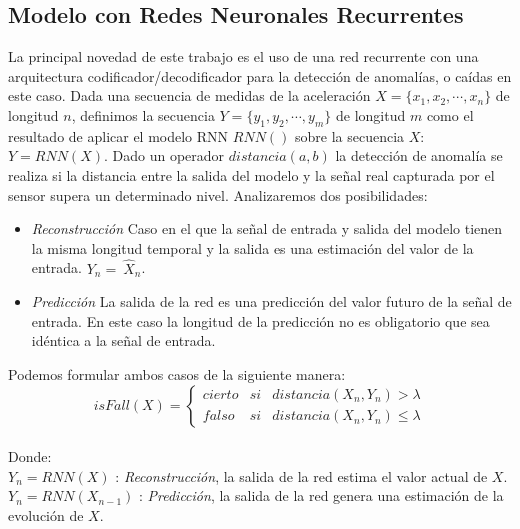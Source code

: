 \subsection{Modelo con Redes Neuronales Recurrentes}\label{sub:imp:model:rnn}

La principal novedad de este trabajo es el uso de una red recurrente con una arquitectura codificador/decodificador para la detección de anomalías, o caídas en este caso. Dada una secuencia de medidas de la aceleración $X=\{x_1,x_2,\cdots,x_n\}$ de longitud $n$, definimos la secuencia $Y=\{y_1, y_2, \cdots,y_m\}$ de longitud $m$ como el resultado de aplicar el modelo RNN $RNN()$ sobre la secuencia $X$: $Y=RNN(X)$. Dado un operador $distancia(a,b)$ la detección de anomalía se realiza si la distancia entre la salida del modelo y la señal real capturada por el sensor supera un determinado nivel. Analizaremos dos posibilidades:
\begin{itemize}
  \item \textsl{Reconstrucción} Caso en el que la señal de entrada y salida del modelo tienen la misma longitud temporal y la salida es una estimación del valor de la entrada. $Y_n =\ \hat{X}_n$.
  \item \textsl{Predicción} La salida de la red es una predicción del valor futuro de la señal de entrada. En este caso la longitud de la predicción no es obligatorio que sea idéntica a la señal de entrada.
\end{itemize}

Podemos formular ambos casos de la siguiente manera:
\[
  isFall(X)=\left\{
    \begin{array}{lcl}
      cierto & si & distancia(X_n,Y_n) > \lambda \\
      falso & si & distancia(X_n,Y_n) \leq  \lambda
    \end{array}
    \right.
\]
\\
Donde:\\
$Y_n = RNN(X)$ : \textsl{Reconstrucción}, la salida de la red estima el valor actual de $X$.\\
$Y_n = RNN(X_{n-1})$ : \textsl{Predicción}, la salida de la red genera una estimación de la evolución de $X$.\\

